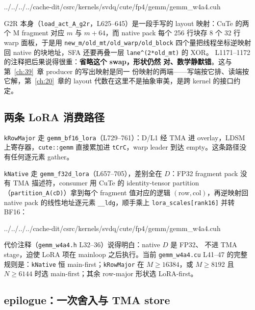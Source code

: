 \begin{lstinputlisting}[linerange={838-857},firstnumber=auto,
  title={gemm\_w4a4.cuh L838-857（kt 归纳的 mainloop 与逐 k-block 交错）}]{../../../../cache-dit/csrc/kernels/svdq/cute/fp4/gemm/gemm_w4a4.cuh}
\end{lstinputlisting}

G2R 本身（\texttt{load\_act\_A\_g2r}，L625--645）是一段手写的 layout
映射：CuTe 的两个 M fragment 对应 $m$ 与 $m+64$，而 native pack
每个 256 行块存 8 个 32 行 warp 面板，于是用
\texttt{new\_m/old\_mt/old\_warp/old\_block} 四个量把线程坐标逆映射回
native 的块地址，SFA 还要再叠一层 \texttt{lane\^{}(2*old\_mt)} 的 XOR。
L1171--1172 的注释把后果说得很重：\textbf{省略这个 swap，形状仍然
对、数学静默错}。这与第~\ref{ch:39}~章 producer 的写出映射是同一
份映射的两端——写端按它排、读端按它解，第~\ref{ch:20}~章的
layout 代数在这里不是抽象审美，是跨 kernel 的接口约定。

\subsection{两条 LoRA 消费路径}\label{sec:40-lora-paths}

\texttt{kRowMajor} 走 \texttt{gemm\_bf16\_lora}（L729--761）：D/L1
经 TMA 进 overlay，LDSM 上寄存器，\texttt{cute::gemm} 直接累加进
\texttt{tCrC}，warp leader 到达 empty。这条路径没有任何逐元素 gather。

\texttt{kNative} 走 \texttt{gemm\_f32d\_lora}（L657--705），差别全在
$D$：FP32 fragment pack 没有 TMA 描述符，consumer 用 CuTe 的
identity-tensor partition（\texttt{partition\_A(cD)}）拿到每个
fragment 值对应的逻辑 $(\mathrm{row},\mathrm{col})$，再逆映射回
native pack 的线性地址逐元素 \texttt{\_\_ldg}，顺手乘上
\texttt{lora\_scales[rank16]} 并转 BF16：

\begin{lstinputlisting}[linerange={685-698},firstnumber=auto,
  title={gemm\_w4a4.cuh L685-698（native FP32 D 的 gather 逆映射）}]{../../../../cache-dit/csrc/kernels/svdq/cute/fp4/gemm/gemm_w4a4.cuh}
\end{lstinputlisting}

代价注释（\texttt{gemm\_w4a4.h} L32--36）说得明白：native $D$ 是 FP32、
不进 TMA stage，迫使 LoRA 项在 mainloop 之后执行。当前
\texttt{gemm\_w4a4.cu} L41--47 的完整规则是：\texttt{kNative} 恒
main-first；\texttt{kRowMajor} 在 $M\ge16384$，或 $M\ge8192$ 且
$N\ge6144$ 时选 main-first；其余 row-major 形状选 LoRA-first。

\subsection{epilogue：一次舍入与 TMA store}

